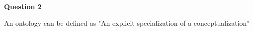 \documentclass[12pt,a4paper]{article}
\begin{document}
\textbf{Question 2}
\newline

An ontology can be defined as "An explicit specialization of a conceptualization" \cite{Gruber1993}


\end{document}
